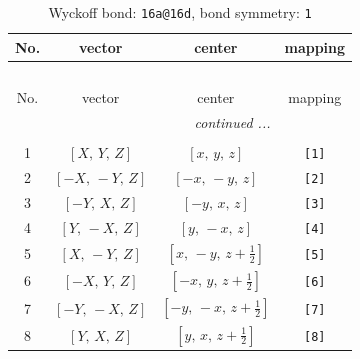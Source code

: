 \documentclass[fleqn,8pt]{jsarticle}
\begin{document}
\begin{longtable}{cccc}
\caption{Wyckoff bond: {\tt 16a@16d}, bond symmetry: {\tt 1}}
 \\
 \hline \hline
No. & vector & center & mapping \\ \hline \endfirsthead

\multicolumn{3}{l}{\tablename\ \thetable{}} \\
 \hline \hline
No. & vector & center & mapping \\ \hline \endhead

 \hline \hline
\multicolumn{3}{r}{\footnotesize\it continued ...} \\ \endfoot

 \hline \hline
\multicolumn{3}{r}{} \\ \endlastfoot

1 & $\left[ X,\, Y,\, Z \right]$ & $\left[ x,\, y,\, z \right]$ & {\tt [1]} \\ \hline
2 & $\left[ - X,\, - Y,\, Z \right]$ & $\left[ - x,\, - y,\, z \right]$ & {\tt [2]} \\ \hline
3 & $\left[ - Y,\, X,\, Z \right]$ & $\left[ - y,\, x,\, z \right]$ & {\tt [3]} \\ \hline
4 & $\left[ Y,\, - X,\, Z \right]$ & $\left[ y,\, - x,\, z \right]$ & {\tt [4]} \\ \hline
5 & $\left[ X,\, - Y,\, Z \right]$ & $\left[ x,\, - y,\, z + \frac{1}{2} \right]$ & {\tt [5]} \\ \hline
6 & $\left[ - X,\, Y,\, Z \right]$ & $\left[ - x,\, y,\, z + \frac{1}{2} \right]$ & {\tt [6]} \\ \hline
7 & $\left[ - Y,\, - X,\, Z \right]$ & $\left[ - y,\, - x,\, z + \frac{1}{2} \right]$ & {\tt [7]} \\ \hline
8 & $\left[ Y,\, X,\, Z \right]$ & $\left[ y,\, x,\, z + \frac{1}{2} \right]$ & {\tt [8]} \\
\end{longtable}
\end{document}
